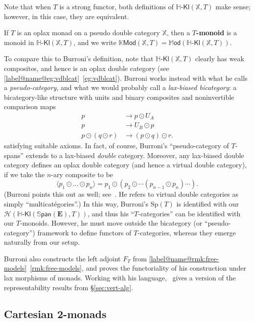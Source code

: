 \documentclass{tac}
\makeatletter
\newcommand{\calH}{\ensuremath{\mathcal{H}}}
\newcommand{\mb}[1]{{\mathbf{#1}}}
\newcommand{\SPAN}[1]{\mathbb{S}\mathsf{pan}\!\left(\mb{#1}\right)}
\newcommand{\Mod}{\ensuremath{\mathbb{M}\mathsf{od}}}
\newcommand{\KMod}{\mathbb{K}\mathsf{Mod}}
\newcommand{\Hkl}[2]{\mathbb{H}\text{-}\mathsf{Kl}(\mathbb{#1},#2)}
\numberwithin{equation}{section}
\def\currthmtype{}
\def\autoref#1{\ref*{label@name@#1}~\ref{#1}}
\def\autoref#1{\ref{label@name@#1}~\ref{#1}}
\let\old@label\label
\def\label#1{%
    {\let\your@currentlabel\@currentlabel%
      \edef\@currentlabel{\currthmtype}%
      \old@label{label@name@#1}}%
    \old@label{#1}}
\makeatother
\begin{document}
Note that when $T$ is a strong functor, both definitions of
$\Hkl{X}{T}$ make sense; however, in this case, they are equivalent.

\begin{definition}
  If $T$ is an oplax monad on a pseudo double category $\mathbb{X}$,
  then a \textbf{$T$-monoid} is a monoid in $\Hkl{X}{T}$, and we write
  $\KMod(\mathbb{X},T) = \Mod(\Hkl{X}{T})$.
\end{definition}

To compare this to Burroni's definition, note that $\Hkl{X}{T}$
clearly has weak composites, and hence is an oplax double category
(see \autoref{eg:vdblcat}).
Burroni works instead with what he calls a \emph{pseudo-category}, and
what we would probably call a \emph{lax-biased bicategory}: a
bicategory-like structure with units and binary composites and
noninvertible comparison maps
\begin{align*}
  p &\to p\odot U_A\\
  p &\to U_B \odot p\\
  p \odot(q\odot r) &\to (p\odot q)\odot r.
\end{align*}
satisfying suitable axioms.  In fact, of course, Burroni's
``pseudo-category of $T$-spans'' extends to a lax-biased \emph{double}
category.  Moreover, any lax-biased double category defines an oplax
double category (and hence a virtual double category), if we take the
$n$-ary composite to be
\[\langle p_1\odot \dots\odot p_n \rangle =
p_1 \odot (p_2\odot \cdots (p_{n-1}\odot p_n)\cdots).
\]
(Burroni points this out as well; see~\cite[p.~66,
example~3]{burroni:t-cats}.  He refers to virtual double categories as
simply ``multicat\'egories''.)
In this way, Burroni's $\mathrm{Sp}(T)$ is identified with our
$\calH(\Hkl{\SPAN{E}}{T})$, and thus his ``$T$-categories'' can be
identified with our $T$-monoids.  However, he must move
outside the bicategory (or ``pseudo-category'') framework to define
functors of $T$-categories,
whereas they emerge naturally from our setup.

Burroni also constructs the left adjoint $F_T$ from
\autoref{rmk:free-models}, and proves the functoriality of his
construction under lax morphisms of monads.  Working with his
language,~\cite{penon:tcats-rep} gives a version of the
representability results from \S\ref{sec:vert-alg}.



\subsection{Cartesian 2-monads}
\label{sec:cartesian-2-monads}
\end{document}
